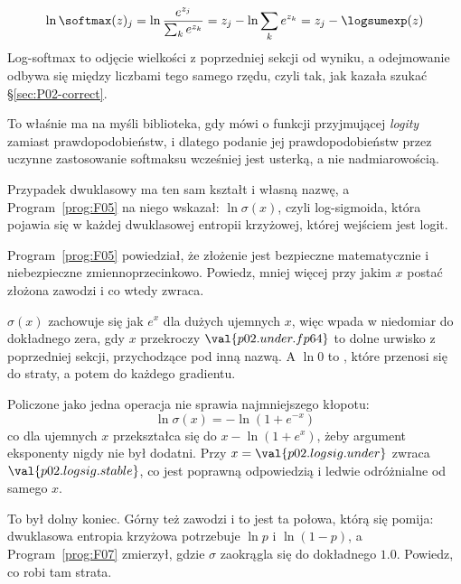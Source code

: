 \begin{fr}

\[ \ln \softmax(z)_j = \ln \frac{e^{z_j}}{\sum_k e^{z_k}}
   = z_j - \ln \sum_k e^{z_k} = z_j - \logsumexp(z) \]
Log-softmax to odjęcie wielkości z poprzedniej sekcji od wyniku, a odejmowanie
odbywa się między liczbami tego samego rzędu, czyli tak,
jak kazała szukać \S\ref{sec:P02-correct}.

To właśnie ma na myśli biblioteka, gdy mówi o funkcji przyjmującej
\emph{logity} zamiast prawdopodobieństw, i dlatego podanie jej
prawdopodobieństw \dash{} przez uczynne zastosowanie softmaksu wcześniej
\dash{} jest usterką, a nie nadmiarowością.
\end{fr}

\begin{fr}
Przypadek dwuklasowy ma ten sam kształt i własną nazwę, a
Program~\ref{prog:F05} na niego wskazał: $\ln \sigma(x)$, czyli log-sigmoida,
która pojawia się w każdej dwuklasowej entropii krzyżowej, której wejściem jest
logit.

Program~\ref{prog:F05} powiedział, że złożenie jest bezpieczne matematycznie i
niebezpieczne zmiennoprzecinkowo. Powiedz, mniej więcej przy jakim $x$ postać
złożona zawodzi i co wtedy zwraca.
\nextframe
\end{fr}

\begin{fr}
$\sigma(x)$ zachowuje się jak $e^{x}$ dla dużych ujemnych $x$, więc wpada w
niedomiar do dokładnego zera, gdy $x$ przekroczy $\val{p02.under.fp64}$
\dash{} to dolne urwisko z poprzedniej sekcji, przychodzące pod inną nazwą. A
$\ln 0$ to , które przenosi się do straty, a potem do
każdego gradientu.

Policzone jako jedna operacja nie sprawia najmniejszego kłopotu:
\[ \ln \sigma(x) = -\ln\!\left(1 + e^{-x}\right) \]
co dla ujemnych $x$ przekształca się do $x - \ln(1 + e^{x})$, żeby argument
eksponenty nigdy nie był dodatni. Przy $x = \val{p02.logsig.under}$ zwraca
$\val{p02.logsig.stable}$, co jest poprawną odpowiedzią i ledwie odróżnialne od
samego $x$.

To był dolny koniec. Górny też zawodzi i to jest ta połowa, którą się pomija:
dwuklasowa entropia krzyżowa potrzebuje $\ln p$ i $\ln(1 - p)$, a
Program~\ref{prog:F07} zmierzył, gdzie $\sigma$ zaokrągla się do dokładnego
$\num{1.0}$. Powiedz, co robi tam strata.
\dotline
\nextframe
\end{fr}

